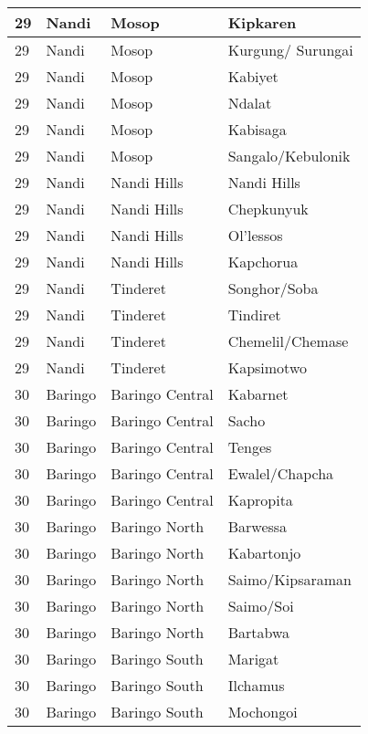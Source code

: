 \begin{table}[!ht]
\begin{tabular}{|l|l|l|l|}
        29 & Nandi & Mosop & Kipkaren \\ \hline
        29 & Nandi & Mosop & Kurgung/ Surungai \\ \hline
        29 & Nandi & Mosop & Kabiyet \\ \hline
        29 & Nandi & Mosop & Ndalat \\ \hline
        29 & Nandi & Mosop & Kabisaga \\ \hline
        29 & Nandi & Mosop & Sangalo/Kebulonik \\ \hline
        29 & Nandi & Nandi Hills & Nandi Hills \\ \hline
        29 & Nandi & Nandi Hills & Chepkunyuk \\ \hline
        29 & Nandi & Nandi Hills & Ol’lessos \\ \hline
        29 & Nandi & Nandi Hills & Kapchorua \\ \hline
        29 & Nandi & Tinderet & Songhor/Soba \\ \hline
        29 & Nandi & Tinderet & Tindiret \\ \hline
        29 & Nandi & Tinderet & Chemelil/Chemase \\ \hline
        29 & Nandi & Tinderet & Kapsimotwo \\ \hline
        30 & Baringo & Baringo Central & Kabarnet \\ \hline
        30 & Baringo & Baringo Central & Sacho \\ \hline
        30 & Baringo & Baringo Central & Tenges \\ \hline
        30 & Baringo & Baringo Central & Ewalel/Chapcha \\ \hline
        30 & Baringo & Baringo Central & Kapropita \\ \hline
        30 & Baringo & Baringo North & Barwessa \\ \hline
        30 & Baringo & Baringo North & Kabartonjo \\ \hline
        30 & Baringo & Baringo North & Saimo/Kipsaraman \\ \hline
        30 & Baringo & Baringo North & Saimo/Soi \\ \hline
        30 & Baringo & Baringo North & Bartabwa \\ \hline
        30 & Baringo & Baringo South & Marigat \\ \hline
        30 & Baringo & Baringo South & Ilchamus \\ \hline
        30 & Baringo & Baringo South & Mochongoi \\ \hline

\end{tabular}
\end{table}
